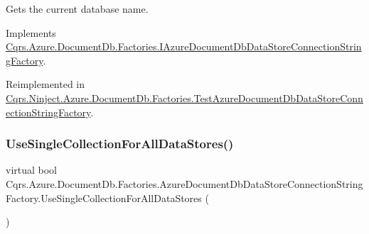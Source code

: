 Gets the current database name. 



Implements \hyperlink{interfaceCqrs_1_1Azure_1_1DocumentDb_1_1Factories_1_1IAzureDocumentDbDataStoreConnectionStringFactory_aa5e3d0920e86a97aef18f4f215ce4f88_aa5e3d0920e86a97aef18f4f215ce4f88}{Cqrs.\+Azure.\+Document\+Db.\+Factories.\+I\+Azure\+Document\+Db\+Data\+Store\+Connection\+String\+Factory}.



Reimplemented in \hyperlink{classCqrs_1_1Ninject_1_1Azure_1_1DocumentDb_1_1Factories_1_1TestAzureDocumentDbDataStoreConnectionStringFactory_ab4b864396b790819609d3337dfb3f75d_ab4b864396b790819609d3337dfb3f75d}{Cqrs.\+Ninject.\+Azure.\+Document\+Db.\+Factories.\+Test\+Azure\+Document\+Db\+Data\+Store\+Connection\+String\+Factory}.

\mbox{\label{classCqrs_1_1Azure_1_1DocumentDb_1_1Factories_1_1AzureDocumentDbDataStoreConnectionStringFactory_aa7b4b3eca609a815358af227b0f53909_aa7b4b3eca609a815358af227b0f53909}} 
\subsubsection{\texorpdfstring{Use\+Single\+Collection\+For\+All\+Data\+Stores()}{UseSingleCollectionForAllDataStores()}}
{\footnotesize\ttfamily virtual bool Cqrs.\+Azure.\+Document\+Db.\+Factories.\+Azure\+Document\+Db\+Data\+Store\+Connection\+String\+Factory.\+Use\+Single\+Collection\+For\+All\+Data\+Stores (\begin{DoxyParamCaption}{ }\end{DoxyParamCaption})\hspace{0.3cm}{\ttfamily [virtual]}}



